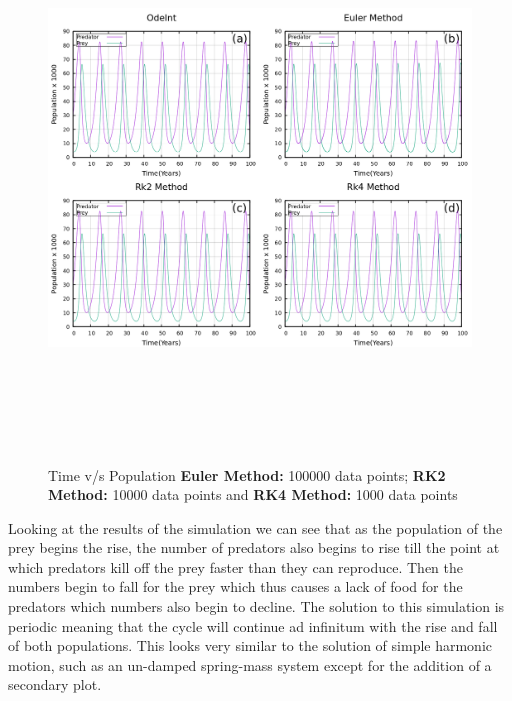 \documentclass[12pt]{article}
\begin{document}
\newpage
\begin{figure}[h] 
    \centering
    \includegraphics[width=18cm,height=15cm]{time_vs_population.png} 
\caption{Time v/s Population \textbf{Euler Method:} 100000 data points; \textbf{RK2 Method:} 10000 data points and \textbf{RK4 Method:} 1000 data points }
\end{figure}
Looking at the results of the simulation we can see that as the population of the prey 
begins the rise, the number of predators also begins to rise till the point at which predators kill 
off the prey faster than they can reproduce. Then the numbers begin to fall for the prey which 
thus causes a lack of food for the predators which numbers also begin to decline. The solution to 
this simulation is periodic meaning that the cycle will continue ad infinitum with the rise and fall 
of both populations. This looks very similar to the solution of simple harmonic motion, such as 
an un-damped spring-mass system except for the addition of a secondary plot.
\end{document}
